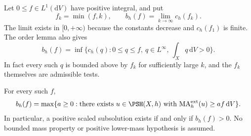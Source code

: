 Let $0\leq f\in L^1(\mathrm{d}V)$ have positive integral, and put
\begin{equation}\label{eq:individual-truncated-normalizer}
 f_k=\min(f,k),\qquad
 b_h(f)=\lim_{k\to\infty}c_h(f_k).
\end{equation}
The limit exists in $[0,+\infty)$ because the constants decrease and $c_h(f_1)$ is finite. The order lemma also gives
\begin{equation}\label{eq:individual-bounded-tests}
 b_h(f)=\inf\{c_h(q):0\leq q\leq f,\ q\in L^\infty,
                                      \ \textstyle\int_Xq\,\mathrm{d}V>0\}.
\end{equation}
In fact every such $q$ is bounded above by $f_k$ for sufficiently large $k$, and the $f_k$ themselves are admissible tests.

\begin{theorem}\label{thm:individual-density-subsolution}
For every such $f$,
\[
 b_h(f)=\max\{a\geq0:\text{there exists }u\in\PSH(X,h)
       \text{ with }\mathrm{MA}^{\mathrm{ext}}_h(u)
                         \geq af\,\mathrm{d}V\}.
\]
In particular, a positive scaled subsolution exists if and only if $b_h(f)>0$. No bounded mass property or positive lower-mass hypothesis is assumed.
\end{theorem}
